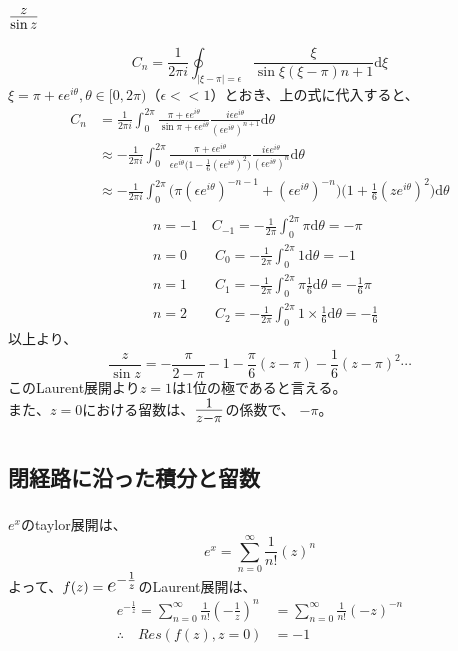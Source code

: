 \documentclass[dvipdfmx,a4paper]{jsarticle}
\begin{document}
\subsubsection{$\mbox{\Large$\frac{z}{\sin{z}}$}$}
$$
C_n = \frac{1}{2\pi i}\oint_{|\xi - \pi| = \epsilon}\frac{\xi}{\sin{\xi}(\xi - \pi)n+1}\mathrm{d}\xi
$$
$\xi = \pi + \epsilon e^{i\theta}, \theta \in [0, 2\pi)$（$\epsilon<<1$）とおき、上の式に代入すると、
\begin{align*}
C_n &= \frac{1}{2\pi i}\int_{0}^{2\pi}\frac{\pi + \epsilon e^{i\theta}}{\sin{\pi + \epsilon e^{i\theta}}}\frac{i\epsilon e^{i\theta}}{(\epsilon e^{i\theta})^{n+1}}\mathrm{d}\theta\\
&\approx -\frac{1}{2\pi i}\int_{0}^{2\pi}\frac{\pi + \epsilon e^{i\theta}}{\epsilon e^{i\theta}\bigl(1 - \frac{1}{6}(\epsilon e^{i\theta})^2\bigr)}\frac{i\epsilon e^{i\theta}}{(\epsilon e^{i\theta})^{n}}\mathrm{d}\theta\\
&\approx -\frac{1}{2\pi i}\int_{0}^{2\pi}\bigl(\pi (\epsilon e^{i\theta})^{-n-1} + (\epsilon e^{i\theta})^{-n}\bigr)\bigl(1 + \frac{1}{6}(ze^{i\theta})^2\bigr)\mathrm{d}\theta \\
\end{align*}
\begin{align*}
&n = -1 \quad C_{-1} = -\frac{1}{2\pi}\int_{0}^{2\pi}\pi \mathrm{d}\theta = -\pi \\
&n = 0 \qquad C_{0} = -\frac{1}{2\pi}\int_{0}^{2\pi}1 \mathrm{d}\theta = -1\\
&n = 1 \qquad C_{1} = -\frac{1}{2\pi}\int_{0}^{2\pi}\pi \frac{1}{6} \mathrm{d}\theta = -\frac{1}{6}\pi \\
&n = 2 \qquad C_{2} = -\frac{1}{2\pi}\int_{0}^{2\pi}1 \times \frac{1}{6} \mathrm{d}\theta = -\frac{1}{6}
\end{align*}
以上より、
$$
\frac{z}{\sin{z}} = -\frac{\pi}{2-\pi} -1 - \frac{\pi}{6}(z-\pi) - \frac{1}{6} (z-\pi)^2 \cdots
$$
このLaurent展開より$z=1$は1位の極であると言える。\\
また、$z =0$における留数は、$\mbox{\Large$\frac{1}{z-\pi}$}$の係数で、 $-\pi$。\\

\section{}
\subsection{閉経路に沿った積分と留数}
\subsubsection{}
$e^x$のtaylor展開は、
$$
e^x = \sum_{n = 0}^{\infty} \frac{1}{n!}(z)^{n}
$$
よって、$f(z) = \mbox{\Large $e^{-\frac{1}{z}}$}$のLaurent展開は、
\begin{align*}
e^{-\frac{1}{z}} = \sum_{n = 0}^{\infty} \frac{1}{n!}(-\frac{1}{z})^{n}& = \sum_{n = 0}^{\infty} \frac{1}{n!}(-z)^{-n}\\
\therefore \quad Res(f(z), z=0) &= -1
\end{align*}
\\
\end{document}
